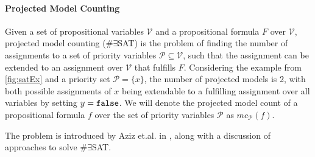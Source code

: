 \paragraph*{Projected Model Counting}
Given a set of propositional variables $\mathcal{V}$ and a propositional formula $F$ over $\mathcal{V}$, projected model counting (\#$\exists$SAT) is the problem of finding the number of assignments to a set of priority variables $\mathcal{P} \subseteq \mathcal{V}$, such that the assignment can be extended to an assignment over $\mathcal{V}$ that fulfills $F$. Considering the example from \ref{fig:satEx} and a priority set $\mathcal{P} = \{x\}$, the number of projected models is 2, with both possible assignments of $x$ being extendable to a fulfilling assignment over all variables by setting $y = \mathtt{false}$. We will denote the projected model count of a propositional formula $f$ over the set of priority variables $\mathcal{P}$ as $mc_\mathcal{P}(f)$.

The problem is introduced by Aziz et.al. in \cite{aziz15}, along with a discussion of approaches to solve \#$\exists$SAT. 


